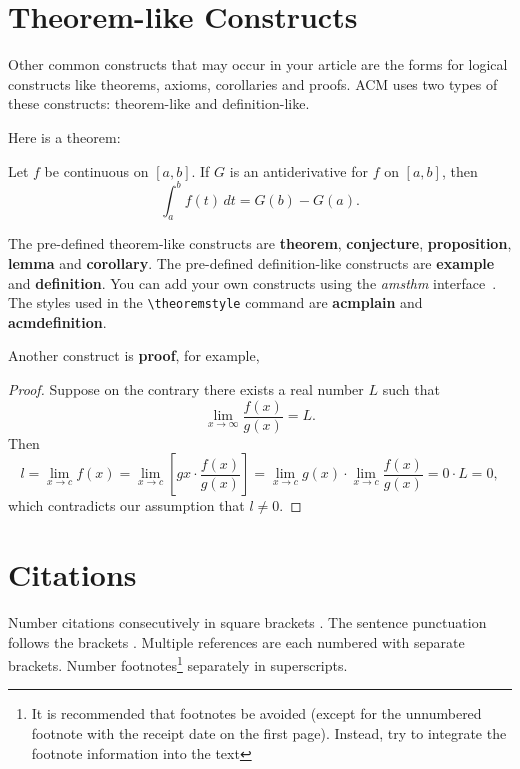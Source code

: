 \documentclass{jiveArticle}
\begin{document}
\section{Theorem-like Constructs}

Other common constructs that may occur in your article are the forms
for logical constructs like theorems, axioms, corollaries and proofs.
ACM uses two types of these constructs:  theorem-like and
definition-like.

Here is a theorem:
\begin{theorem}
	Let $f$ be continuous on $[a,b]$.  If $G$ is
	an antiderivative for $f$ on $[a,b]$, then
	\begin{displaymath}
	\int^b_af(t)\,dt = G(b) - G(a).
	\end{displaymath}
\end{theorem}


The pre-defined theorem-like constructs are \textbf{theorem},
\textbf{conjecture}, \textbf{proposition}, \textbf{lemma} and
\textbf{corollary}.  The pre-defined de\-fi\-ni\-ti\-on-like constructs are
\textbf{example} and \textbf{definition}.  You can add your own
constructs using the \textsl{amsthm} interface~\cite{Amsthm15}.  The
styles used in the \verb|\theoremstyle| command are \textbf{acmplain}
and \textbf{acmdefinition}.

Another construct is \textbf{proof}, for example,

\begin{proof}
	Suppose on the contrary there exists a real number $L$ such that
	\begin{displaymath}
	\lim_{x\rightarrow\infty} \frac{f(x)}{g(x)} = L.
	\end{displaymath}
	Then
	\begin{displaymath}
	l=\lim_{x\rightarrow c} f(x)
	= \lim_{x\rightarrow c}
	\left[ g{x} \cdot \frac{f(x)}{g(x)} \right ]
	= \lim_{x\rightarrow c} g(x) \cdot \lim_{x\rightarrow c}
	\frac{f(x)}{g(x)} = 0\cdot L = 0,
	\end{displaymath}
	which contradicts our assumption that $l\neq 0$.
\end{proof}



\section{Citations}
Number citations consecutively in square brackets \cite{Vachhani2015}. The sentence punctuation follows the brackets \cite{Bts2013}. Multiple references \cite{Bort2010,Ghafoor2015,Samra2008} are each numbered with separate brackets. Number footnotes\footnote{ It is recommended that footnotes be avoided (except for the unnumbered footnote with the receipt date on the first page). Instead, try to integrate the footnote information into the text} separately in superscripts. 
\end{document}
